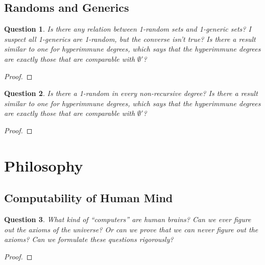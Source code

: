 \documentclass{article}
\newtheorem{question}{Question}[subsection]
\begin{document}
  \subsection{Randoms and Generics}
    \begin{question}
      Is there any relation between 1-random sets and 1-generic sets? I
      suspect all 1-generics are 1-random, but the converse isn't true? Is
      there a result similar to one for hyperimmune degrees, which says
      that the hyperimmune degrees are exactly those that are comparable
      with $\emptyset'$?
    \end{question}
    \begin{proof}
    \end{proof}

    \begin{question}
      Is there a 1-random in every non-recursive degree? Is there a result
      similar to one for hyperimmune degrees, which says that the
      hyperimmune degrees are exactly those that are comparable with
      $\emptyset'$?
    \end{question}
    \begin{proof}
    \end{proof}

\section{Philosophy}
  \subsection{Computability of Human Mind}
    \begin{question}
      What kind of ``computers'' are human brains? Can we ever figure out
      the axioms of the universe? Or can we prove that we can never figure
      out the axioms? Can we formulate these questions rigorously?
    \end{question}
    \begin{proof}
    \end{proof}
\end{document}
